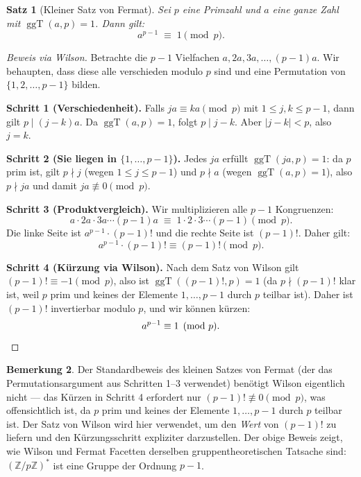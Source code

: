 \documentclass[12pt,a4paper]{amsart}
\newtheorem{theorem}{Satz}[section]
\theoremstyle{definition}
\newtheorem{bemerkung}[theorem]{Bemerkung}
\newcommand{\Z}{\mathbb{Z}}
\DeclareMathOperator{\ggT}{ggT}
\begin{document}
\begin{theorem}[Kleiner Satz von Fermat]\label{satz:fermat}
  Sei $p$ eine Primzahl und $a$ eine ganze Zahl mit $\ggT(a,p) = 1$.
  Dann gilt:
  \[
    a^{p-1} \;\equiv\; 1 \pmod{p}.
  \]
\end{theorem}

\begin{proof}[Beweis via Wilson]
  Betrachte die $p-1$ Vielfachen $a, 2a, 3a, \ldots, (p-1)a$.
  Wir behaupten, dass diese alle verschieden modulo $p$ sind und eine
  Permutation von $\{1, 2, \ldots, p-1\}$ bilden.

  \textbf{Schritt 1 (Verschiedenheit).}
  Falls $ja \equiv ka \pmod{p}$ mit $1 \leq j, k \leq p-1$, dann gilt
  $p \mid (j-k)a$. Da $\ggT(a,p)=1$, folgt $p \mid j-k$.
  Aber $|j-k| < p$, also $j = k$.

  \textbf{Schritt 2 (Sie liegen in $\{1,\ldots,p-1\}$).}
  Jedes $ja$ erfüllt $\ggT(ja, p) = 1$: da $p$ prim ist, gilt $p \nmid j$
  (wegen $1 \leq j \leq p-1$) und $p \nmid a$ (wegen $\ggT(a,p)=1$), also $p \nmid ja$
  und damit $ja \not\equiv 0 \pmod{p}$.

  \textbf{Schritt 3 (Produktvergleich).}
  Wir multiplizieren alle $p-1$ Kongruenzen:
  \[
    a \cdot 2a \cdot 3a \cdots (p-1)a \;\equiv\; 1 \cdot 2 \cdot 3 \cdots (p-1) \pmod{p}.
  \]
  Die linke Seite ist $a^{p-1} \cdot (p-1)!$ und die rechte Seite ist $(p-1)!$.
  Daher gilt:
  \[
    a^{p-1} \cdot (p-1)! \equiv (p-1)! \pmod{p}.
  \]

  \textbf{Schritt 4 (Kürzung via Wilson).}
  Nach dem Satz von Wilson gilt $(p-1)! \equiv -1 \pmod{p}$, also ist
  $\ggT((p-1)!, p) = 1$ (da $p \nmid (p-1)!$ klar ist, weil $p$ prim und
  keines der Elemente $1, \ldots, p-1$ durch $p$ teilbar ist).
  Daher ist $(p-1)!$ invertierbar modulo $p$, und wir können kürzen:
  \[
    a^{p-1} \equiv 1 \pmod{p}. \qedhere
  \]
\end{proof}

\begin{bemerkung}
  Der Standardbeweis des kleinen Satzes von Fermat (der das Permutationsargument
  aus Schritten 1--3 verwendet) benötigt Wilson eigentlich nicht — das Kürzen
  in Schritt 4 erfordert nur $(p-1)! \not\equiv 0 \pmod{p}$, was offensichtlich
  ist, da $p$ prim und keines der Elemente $1, \ldots, p-1$ durch $p$ teilbar ist.
  Der Satz von Wilson wird hier verwendet, um den \emph{Wert} von $(p-1)!$ zu
  liefern und den Kürzungsschritt expliziter darzustellen.
  Der obige Beweis zeigt, wie Wilson und Fermat Facetten derselben
  gruppentheoretischen Tatsache sind: $(\Z/p\Z)^*$ ist eine Gruppe der Ordnung $p-1$.
\end{bemerkung}
\end{document}
